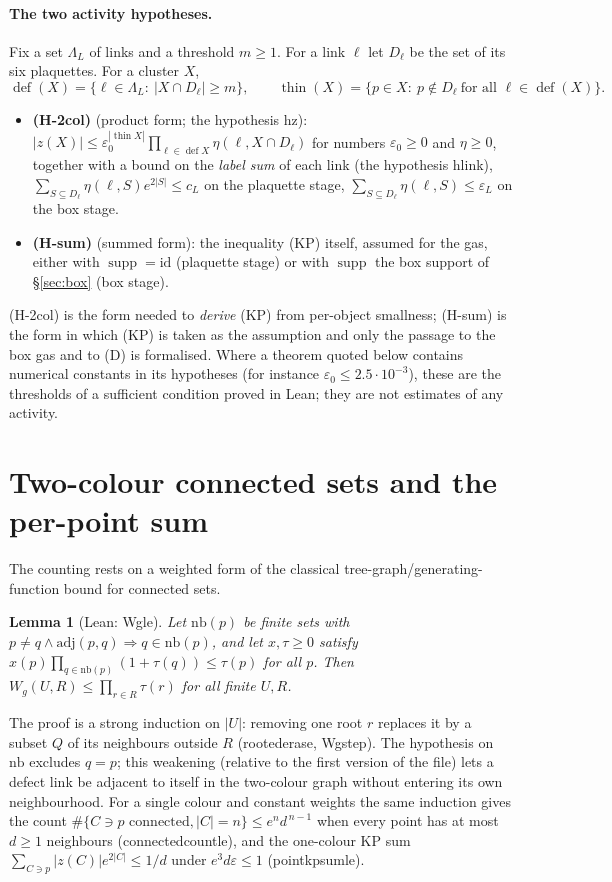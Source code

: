 \documentclass[11pt,a4paper]{article}
\newtheorem{lemma}[theorem]{Lemma}
\theoremstyle{definition}
\theoremstyle{remark}
\DeclareRobustCommand{\lean}[1]{{\ttfamily\renewcommand{\_}{\textunderscore\allowbreak}#1}}
\newcommand{\thin}{\operatorname{thin}}
\newcommand{\dfc}{\operatorname{def}}
\newcommand{\supp}{\operatorname{supp}}
\begin{document}
\paragraph{The two activity hypotheses.} Fix a set $\Lambda_L$ of links and a threshold $m\ge1$. For a link $\ell$ let $D_\ell$ be the set of its six plaquettes. For a cluster $X$,
\[
\dfc(X)=\{\ell\in\Lambda_L:\ |X\cap D_\ell|\ge m\},\qquad \thin(X)=\{p\in X:\ p\notin D_\ell\ \text{for all }\ell\in\dfc(X)\}.
\]
\begin{itemize}[leftmargin=2em]
\item \textbf{(H-2col)} (product form; the hypothesis \lean{hz}): $|z(X)|\le\varepsilon_0^{|\thin X|}\prod_{\ell\in\dfc X}\eta(\ell,X\cap D_\ell)$ for numbers $\varepsilon_0\ge0$ and $\eta\ge0$, together with a bound on the \emph{label sum} of each link (the hypothesis \lean{hlink}), $\sum_{S\subseteq D_\ell}\eta(\ell,S)e^{2|S|}\le c_L$ on the plaquette stage, $\sum_{S\subseteq D_\ell}\eta(\ell,S)\le\varepsilon_L$ on the box stage.
\item \textbf{(H-sum)} (summed form): the inequality (KP) itself, assumed for the gas, either with $\supp=\mathrm{id}$ (plaquette stage) or with $\supp$ the box support of \S\ref{sec:box} (box stage).
\end{itemize}
(H-2col) is the form needed to \emph{derive} (KP) from per-object smallness; (H-sum) is the form in which (KP) is taken as the assumption and only the passage to the box gas and to (D) is formalised. Where a theorem quoted below contains numerical constants in its hypotheses (for instance $\varepsilon_0\le2.5\cdot10^{-3}$), these are the thresholds of a sufficient condition proved in Lean; they are not estimates of any activity.

\section{Two-colour connected sets and the per-point sum}\label{sec:twocolour}

The counting rests on a weighted form of the classical tree-graph/generating-function bound for connected sets.

\begin{lemma}[Lean: \lean{Wg\_le}]\label{lem:Wg}
Let $\mathrm{nb}(p)$ be finite sets with $p\neq q\wedge\mathrm{adj}(p,q)\Rightarrow q\in\mathrm{nb}(p)$, and let $x,\tau\ge0$ satisfy $x(p)\prod_{q\in\mathrm{nb}(p)}(1+\tau(q))\le\tau(p)$ for all $p$. Then $W_g(U,R)\le\prod_{r\in R}\tau(r)$ for all finite $U,R$.
\end{lemma}
The proof is a strong induction on $|U|$: removing one root $r$ replaces it by a subset $Q$ of its neighbours outside $R$ (\lean{rooted\_erase}, \lean{Wg\_step}). The hypothesis on $\mathrm{nb}$ excludes $q=p$; this weakening (relative to the first version of the file) lets a defect link be adjacent to itself in the two-colour graph without entering its own neighbourhood. For a single colour and constant weights the same induction gives the count $\#\{C\ni p\text{ connected},|C|=n\}\le e^n d^{\,n-1}$ when every point has at most $d\ge1$ neighbours (\lean{connected\_count\_le}), and the one-colour KP sum $\sum_{C\ni p}|z(C)|e^{2|C|}\le1/d$ under $e^3d\varepsilon\le1$ (\lean{point\_kp\_sum\_le}).
\end{document}
